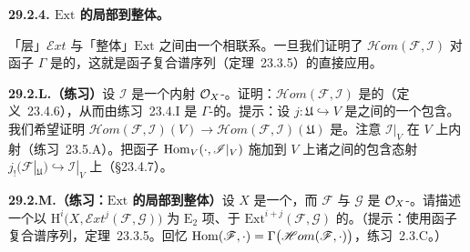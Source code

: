 \textbf{29.2.4. $\mathrm{Ext}$ 的局部到整体\trSpectralSequence。}

「层」$\mathscr{E}xt$ 与「整体」$\mathrm{Ext}$ 之间由一个\trSpectralSequence{}相联系。一旦我们证明了 $\mathscr{H}om(\mathscr{F},\mathscr{I})$ 对函子 $\Gamma$ 是\trAcyclic{}的，这就是\trGrothendieck{}函子复合谱序列（\mbox{定理~23.3.5}）的直接应用。

\textbf{29.2.L.（练习）}\quad 设 $\mathscr{I}$ 是一个内射 $\mathcal{O}_X$-\trModule。证明：$\mathscr{H}om(\mathscr{F},\mathscr{I})$ 是\trFlasque{}的（\mbox{定义~23.4.6}），从而由\mbox{练习~23.4.I} 是 $\Gamma$-\trAcyclic{}的。提示：设 $j\colon\mathfrak{U}\hookrightarrow V$ 是\trOpenSubset{}之间的一个包含。我们希望证明 $\mathscr{H}om(\mathscr{F},\mathscr{I})(V)\to\mathscr{H}om(\mathscr{F},\mathscr{I})(\mathfrak{U})$ 是\trSurjectiveMap。注意 $\mathscr{I}|_V$ 在 $V$ 上内射（\mbox{练习~23.5.A}）。把\trExact{}函子 $\operatorname{Hom}_V(\cdot,\mathscr{I}|_V)$ 施加到 $V$ 上诸\trSheaf{}之间的包含态射 $j_!(\mathscr{F}|_{\mathfrak{U}})\hookrightarrow\mathscr{I}|_V$ 上（\S23.4.7）。

\textbf{29.2.M.（练习：$\mathrm{Ext}$ 的局部到整体\trSpectralSequence）}\quad 设 $X$ 是一个\trRingedSpace，而 $\mathscr{F}$ 与 $\mathscr{G}$ 是 $\mathcal{O}_X$-\trModule。请描述一个以 $\mathrm{H}^i\bigl(X,\mathscr{E}xt^j(\mathscr{F},\mathscr{G})\bigr)$ 为 $\mathrm{E}_2$ 项、\trAbut{}于 $\mathrm{Ext}^{i+j}(\mathscr{F},\mathscr{G})$ 的\trSpectralSequence。（提示：使用\trGrothendieck{}函子复合谱序列，\mbox{定理~23.3.5}。回忆 $\operatorname{Hom}(\mathscr{F},\cdot)=\Gamma\bigl(\mathscr{H}om(\mathscr{F},\cdot)\bigr)$，\mbox{练习~2.3.C}。）
